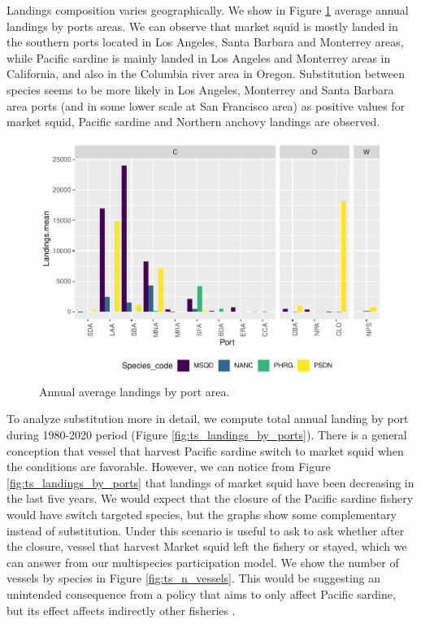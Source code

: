 \documentclass[
]{article}
\begin{document}
Landings composition varies geographically. We show in Figure
\ref{fig:avg_landings_by_ports} average annual landings by ports areas.
We can observe that market squid is mostly landed in the southern ports
located in Los Angeles, Santa Barbara and Monterrey areas, while Pacific
sardine is mainly landed in Los Angeles and Monterrey areas in
California, and also in the Columbia river area in Oregon. Substitution
between species seems to be more likely in Los Angeles, Monterrey and
Santa Barbara area ports (and in some lower scale at San Francisco area)
as positive values for market squid, Pacific sardine and Northern
anchovy landings are observed.

\begin{figure}
\centering
\includegraphics{econ_landings_paper_files/figure-latex/avg_landings_by_port-1.pdf}
\caption{Annual average landings by port
area.\label{fig:avg_landings_by_ports}}
\end{figure}

To analyze substitution more in detail, we compute total annual landing
by port during 1980-2020 period (Figure \ref{fig:ts_landings_by_ports}).
There is a general conception that vessel that harvest Pacific sardine
switch to market squid when the conditions are favorable. However, we
can notice from Figure \ref{fig:ts_landings_by_ports} that landings of
market squid have been decreasing in the last five years. We would
expect that the closure of the Pacific sardine fishery would have switch
targeted species, but the graphs show some complementary instead of
substitution. Under this scenario is useful to ask to ask whether after
the closure, vessel that harvest Market squid left the fishery or
stayed, which we can answer from our multispecies participation model.
We show the number of vessels by species in Figure
\ref{fig:ts_n_vessels}. This would be suggesting an unintended
consequence from a policy that aims to only affect Pacific sardine, but
its effect affects indirectly other fisheries \citep{richerson2017}.
\end{document}
